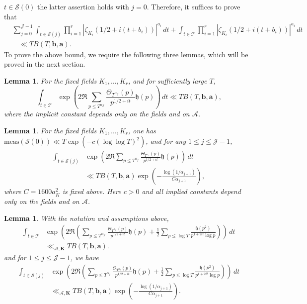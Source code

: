 \documentclass[twoside,reqno,11pt,a4paper]{amsart}
\numberwithin{equation}{section}
\theoremstyle{plain}
\newtheorem{lem}[thm]{Lemma}
\theoremstyle{definition}
\theoremstyle{remark}
\renewcommand{\le}{\leqslant}
\begin{document}
    $t\in\mathcal S(0)$ the latter assertion holds with $j=0$.
	Therefore, it suffices to prove that 
	\begin{align*}
	\nonumber	&\sum_{j=0}^{\mathcal{J}-1}\int_{t\in \mathcal{S}(j)} \prod_{i=1}^r\left| \zeta_{K_i}\left(1/2+i(t+b_i)\right)\right|^{a_i}\,dt +\int_{t\in\mathcal{T}} \prod_{i=1}^r\left| \zeta_{K_i}\left(1/2+i(t+b_i)\right)\right|^{a_i}\,dt\\
		& \ \ \ \ \ll T B(T,\mathbf b,\mathbf a).
	\end{align*}
To prove the above bound, we require the following three lemmas, which will be proved in the next section.
	\begin{lem}\label{first-main-lemma}
	For the fixed fields $K_1,\ldots,K_r$, and for sufficiently large $T$,
		\begin{equation*}
			\int_{t\in\mathcal{T}} \exp\left(2 \Re \sum_{p\le  T^{\alpha_\mathcal{J}}} \frac{\Theta_{T^{\alpha_{\mathcal{J}}}}(p)}{p^{1/2+it}}\mathfrak{h}(p)\right)\,dt \ll T B(T,\mathbf b,\mathbf a),
		\end{equation*}
		where the implicit constant depends only on the fields and on $\mathcal A$.
	\end{lem}
	\begin{lem}\label{second-main-lemma}
	For the fixed fields $K_1,\ldots,K_r$, one has $\text{meas}(\mathcal{S}(0))\ll T\exp(-c(\log\log T)^2)$, and for any $1\le  j\le  \mathcal{J}-1$,
		\begin{align*}
			\int_{t\in\mathcal{S}(j)} &\exp\left(2 \Re \sum_{p\le  T^{\alpha_j}} \frac{\Theta_{T^{\alpha_{j}}}(p)}{p^{1/2 +it}}\mathfrak{h}(p)\right)\,dt \\
            &\ll T B(T,\mathbf b,\mathbf a)
            \exp\left( -\frac{\log(1/\alpha_{j+1})}{C\alpha_{j+1}}\right),
		\end{align*}
			where $C=1600a_K^2$ is fixed above.
			Here $c>0$ and all implied constants depend only on the fields
			and on $\mathcal A$.
	\end{lem}
	
	\begin{lem}\label{third-main-lemma}
		With the notation and assumptions above,
		\begin{align}
		\int_{t\in\mathcal{T}} &\exp\left(2 \Re \left(\sum_{p\le  T^{\alpha_\mathcal{J}}} \frac{\Theta_{T^{\alpha_{\mathcal{J}}}}(p)}{p^{1/2 +it}}\mathfrak{h}(p)+\frac{1}{2}\sum_{p\le  \log T} \frac{\mathfrak{h}(p^2)}{p^{1+2it}\log p}\right)\right)\,dt\nonumber\\
			&\ll_{\mathcal A,\mathbf K} T B(T,\mathbf b,\mathbf a).
		\label{first-integral-third-lemma}
		\end{align}
		and for $1\le  j\le  \mathcal{J}-1$, we have 
		\begin{align}\label{second-integral-third-lemma}
			\int_{t\in\mathcal{S}(j)}&\exp\left(2 \Re \left(\sum_{p\le  T^{\alpha_j}} \frac{\Theta_{T^{\alpha_j}}(p)}{p^{1/2 +it}}\mathfrak{h}(p)+\frac{1}{2}\sum_{p\le  \log T} \frac{\mathfrak{h}(p^2)}{p^{1+2it}\log p}\right)\right)\,dt\\
			& \nonumber\ll_{\mathcal A,\mathbf K}T B(T,\mathbf b,\mathbf a)\exp\left( -\frac{\log(1/\alpha_{j+1})}{C\alpha_{j+1}}\right).
		\end{align}
		\end{lem}
\end{document}
